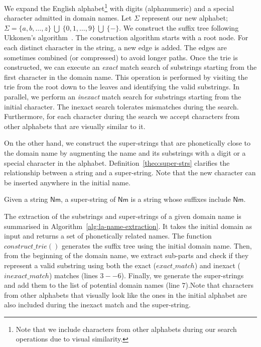 We expand the English alphabet\footnote{Note that we include characters from other alphabets during our search operations due to visual similarity.} with digits (alphanumeric) and a special character admitted in domain names. Let $\Sigma$ represent our new alphabet; $\Sigma = \{a, b, \ldots, z\}~\bigcup~\{0, 1, \ldots, 9\}~\bigcup~\{-\}$. We construct the suffix tree following Ukkonen's algorithm~\cite{ukkonen:1995}. The construction algorithm starts with a root node. For each distinct character in the string, a new edge is added. The edges are sometimes combined (or compressed) to avoid longer paths. Once the trie is constructed, we can execute an \emph{exact} match search of substrings starting from the first character in the domain name.  This operation is performed by visiting the trie from the root down to the leaves and identifying the valid substrings. In parallel, we perform an \emph{inexact} match search for substrings starting from the initial character. The inexact search tolerates mismatches during the search. Furthermore, for each character during the search we accept characters from other alphabets that are visually similar to it. 

On the other hand, we construct the super-strings that are phonetically close to the domain name by augmenting the name and its substrings with a digit or a special character in the alphabet. Definition~\ref{theo:super-strs} clarifies the relationship between a string and a super-string. Note that the new character can be inserted anywhere in the initial name. 

\begin{definition}
  \label{theo:super-strs}
  Given a string $\mathsf{Nm}$, a super-string of $\mathsf{Nm}$ is a string whose suffixes include $\mathsf{Nm}$.
\end{definition}

The extraction of the substrings and super-strings of a given domain name is summarised in Algorithm~\ref{alg:la-name-extraction}. It takes the initial domain as input and returns a set of phonetically related names. The function $\mathit{construct\_trie}()$ generates the suffix tree using the initial domain name. Then, from the beginning of the domain name, we extract sub-parts and check if they represent a valid substring using both the exact ($\mathit{exact\_match}$) and inexact ($\mathit{inexact\_match}$) matches (lines $3 -- 6$). Finally, we generate the super-strings and add them to the list of potential domain names (line $7$).Note that characters from other alphabets that visually look like the ones in the initial alphabet are also included during the inexact match and the super-string. 

